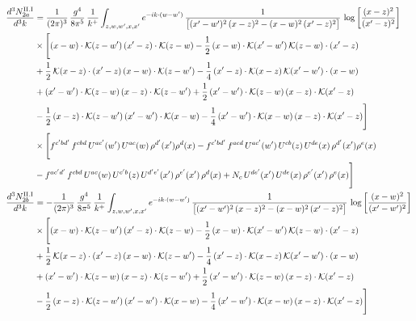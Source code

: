 \documentclass[9pt]{article}
\numberwithin{equation}{section}
\begin{document}
\begin{align}
\frac{d^{3}N^{\rm II.I}_{2a}}{d^{3}k}&=\frac{1}{(2\pi)^{3}}\,\frac{g^{4}}{8\pi^{5}}\,\frac{1}{k^{+}}\int_{z,w,w^{\prime},x,x^{\prime}}e^{-ik\cdot{(w-w^{\prime})}}\,\frac{1}{\big[(x^{\prime}-w^{\prime})^{2}\,(x-z)^{2}-(x-w)^{2}\,(x^{\prime}-z)^{2}\big]}\,\log\left[\frac{(x-z)^{2}}{(x^{\prime}-z)^{2}}\right]\notag\\
&\times\Bigg[(x-w)\cdot\mathcal{K}(z-w^{\prime})\,(x^{\prime}-z)\cdot\mathcal{K}(z-w)-\frac{1}{2}\,(x-w)\cdot\mathcal{K}(x^{\prime}-w^{\prime})\,\mathcal{K}(z-w)\cdot(x^{\prime}-z)\notag \\ & +\frac{1}{2}\,\mathcal{K}(x-z)\cdot(x^{\prime}-z)\,(x-w)\cdot\mathcal{K}(z-w^{\prime}) -\frac{1}{4}\,(x^{\prime}-z)\cdot\mathcal{K}(x-z)\,\mathcal{K}(x^{\prime}-w^{\prime})\cdot(x-w)\notag \\ & +(x^{\prime}-w^{\prime})\cdot\mathcal{K}(z-w)\,(x-z)\cdot\mathcal{K}(z-w^{\prime})+\frac{1}{2}\,(x^{\prime}-w^{\prime})\cdot\mathcal{K}(z-w)\,(x-z)\cdot\mathcal{K}(x^{\prime}-z)\notag \\ & -\frac{1}{2}\,(x-z)\cdot\mathcal{K}(z-w^{\prime})\,(x^{\prime}-w^{\prime})\cdot\mathcal{K}(x-w)-\frac{1}{4}\,(x^{\prime}-w^{\prime})\cdot\mathcal{K}(x-w)\,(x-z)\cdot\mathcal{K}(x^{\prime}-z)\Bigg]\notag \\ & \times\Bigg[f^{c^{\prime}bd^{\prime}}\,f^{cbd}\, U^{ac^{\prime}}(w^{\prime})\,U^{ac}(w)\,\rho^{d^{\prime}}(x^{\prime})\rho^{d}(x)- f^{c^{\prime}bd^{\prime}}\,f^{acd}\,U^{ac^{\prime}}(w^{\prime})\,U^{cb}(z)\,U^{de}(x)\,\rho^{d^{\prime}}(x^{\prime})\rho^{e}(x) \notag \\ & -f^{ac^{\prime}d^{\prime}}\,f^{cbd}\,U^{ac}(w)\,U^{c^{\prime}b}(z)\,U^{d^{\prime}e^{\prime}}(x^{\prime})\,\rho^{e^{\prime}}(x^{\prime})\,\rho^{d}(x) +N_{c}\,U^{de^{\prime}}(x^{\prime})\,U^{de}(x)\,\rho^{e^{\prime}}(x^{\prime})\,\rho^{e}(x)\Bigg]\\
\frac{d^{3}N^{\rm II.I}_{2b}}{d^{3}k}&= -\frac{1}{(2\pi)^{3}}\,\frac{g^{4}}{8\pi^{5}}\,\frac{1}{k^{+}}\int_{z,w,w^{\prime},x,x^{\prime}}e^{-ik\cdot{(w-w^{\prime})}}\,\frac{1}{\big[(x^{\prime}-w^{\prime})^{2}\,(x-z)^{2}-(x-w)^{2}\,(x^{\prime}-z)^{2}\big]}\,\log\left[\frac{(x-w)^{2}}{(x^{\prime}-w^{\prime})^{2}}\right]\notag\\
&\times\Bigg[(x-w)\cdot\mathcal{K}(z-w^{\prime})\,(x^{\prime}-z)\cdot\mathcal{K}(z-w)-\frac{1}{2}\,(x-w)\cdot\mathcal{K}(x^{\prime}-w^{\prime})\,\mathcal{K}(z-w)\cdot(x^{\prime}-z)\notag \\ & +\frac{1}{2}\,\mathcal{K}(x-z)\cdot(x^{\prime}-z)\,(x-w)\cdot\mathcal{K}(z-w^{\prime}) -\frac{1}{4}\,(x^{\prime}-z)\cdot\mathcal{K}(x-z)\,\mathcal{K}(x^{\prime}-w^{\prime})\cdot(x-w)\notag \\ & +(x^{\prime}-w^{\prime})\cdot\mathcal{K}(z-w)\,(x-z)\cdot\mathcal{K}(z-w^{\prime})+\frac{1}{2}\,(x^{\prime}-w^{\prime})\cdot\mathcal{K}(z-w)\,(x-z)\cdot\mathcal{K}(x^{\prime}-z)\notag \\ & -\frac{1}{2}\,(x-z)\cdot\mathcal{K}(z-w^{\prime})\,(x^{\prime}-w^{\prime})\cdot\mathcal{K}(x-w)-\frac{1}{4}\,(x^{\prime}-w^{\prime})\cdot\mathcal{K}(x-w)\,(x-z)\cdot\mathcal{K}(x^{\prime}-z)\Bigg]\notag\\

\end{align}
\end{document}
